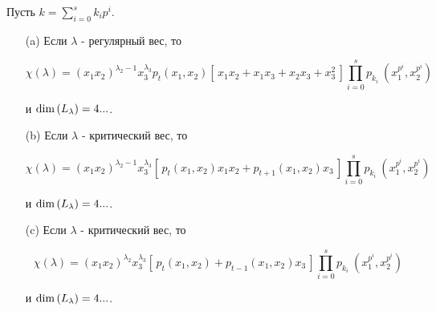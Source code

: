 \begin{proposition} Пусть $ k = \sum\limits_{i = 0}^{s} k_i p^i $.
\begin{enumerate}
\item [\textup{(a)}] Если $\lambda$ - регулярный вес, то 

$$ \chi(\lambda) = (x_1 x_2)^{\lambda_2 - 1} x_3^{\lambda_3} p_t (x_1, x_2) [\,x_1 x_2 + x_1 x_3 + x_2 x_3 + x_3^2\,] \prod\limits_{i = 0}^{s}p_{k_i} ~(x_1^{p^i}, x_2^{p^i})$$

и $ \mbox{\textup{dim}}\,(L_{\lambda}) = 4 ...$.

\item [\textup{(b)}] Если $\lambda$ - критический вес, то

$$ \chi(\lambda) = (x_1 x_2)^{\lambda_2 - 1} x_3^{\lambda_3} [\,p_t (x_1, x_2) x_1 x_2 + p_{t + 1} (x_1, x_2) x_3\,] \prod\limits_{i = 0}^{s}p_{k_i} ~(x_1^{p^i}, x_2^{p^i}) $$

и $\mbox{\textup{dim}}\,(L_{\lambda}) = 4 ...$.
\item [\textup{(c)}] Если $\lambda$ - критический вес, то

$$ \chi(\lambda) = (x_1 x_2)^{\lambda_2} x_3^{\lambda_3} [\,p_t (x_1, x_2) + p_{t - 1} (x_1, x_2) x_3 \,] \prod\limits_{i = 0}^{s}p_{k_i} ~(x_1^{p^i}, x_2^{p^i}) $$

и $\mbox{\textup{dim}}\,(L_{\lambda}) = 4 ...$.
\end{enumerate}
\end{proposition}
